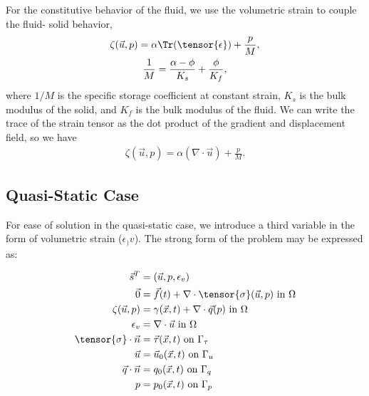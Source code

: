 For the constitutive behavior of the fluid, we use the volumetric strain to couple the fluid-
solid behavior,
\begin{gather}
  \zeta(\vec{u},p) = \alpha \Tr({\tensor{\epsilon}}) + \frac{p}{M}, \\
%
  \frac{1}{M} = \frac{\alpha-\phi}{K_s} + \frac{\phi}{K_f},
\end{gather}
where $1/M$ is the specific storage coefficient at constant strain,
$K_s$ is the bulk modulus of the solid, and $K_f$ is the bulk modulus
of the fluid. We can write the trace of the strain tensor as the dot product of the gradient
and displacement
field, so we have
\begin{gather}
  \zeta(\vec{u},p) = \alpha (\nabla \cdot \vec{u}) + \frac{p}{M}.
\end{gather}

\subsection{Quasi-Static Case}


For ease of solution in the quasi-static case, we introduce a third variable in the form of volumetric strain ($\epsilon_){v}$).
The strong form of the problem may be expressed as:

\begin{align}
\vec{s}^{T} &= \left(\vec{u}, p, \epsilon_{v}\right) \\
\vec{0} &= \vec{f}(t) + \nabla \cdot \tensor{\sigma}(\vec{u},p) \text{ in } \Omega \\
\zeta(\vec{u},p) &= \gamma(\vec{x},t) + \nabla \cdot \vec{q}(p) \text{ in } \Omega \\
\epsilon_{v} &= \nabla \cdot \vec{u} \text{ in } \Omega \\
\tensor{\sigma} \cdot \vec{n} &= \vec{\tau}(\vec{x},t) \text{ on } \Gamma_{\tau} \\
\vec{u} &= \vec{u}_{0}(\vec{x}, t) \text{ on } \Gamma_{u} \\
\vec{q} \cdot \vec{n} &= q_{0}(\vec{x}, t) \text{ on } \Gamma_{q} \\
p &= p_{0}(\vec{x},t) \text{ on } \Gamma_{p}
\end{align}


